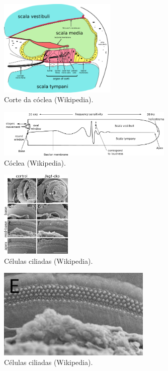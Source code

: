 \begin{frame}[allowframebreaks]
  \begin{figure}[h]
  \centering
  \includegraphics[width=0.5\textwidth]{images/cochlea-crosssection.pdf}
  \caption{Corte da cóclea (Wikipedia).}
  \label{fig-cochlea-crosssection}
  \end{figure}

  \framebreak

  \begin{figure}[h]
  \centering
  \includegraphics[width=0.75\textwidth]{images/uncoiled-cochlea.pdf}
  \caption{Cóclea (Wikipedia).}
  \label{fig-uncoiled-cochlea}
  \end{figure}

  \framebreak

  \begin{figure}[h]
  \centering
  \includegraphics[width=0.3\textwidth]{images/hair-cell-pattern.jpg}
  \caption{Células ciliadas (Wikipedia).}
  \label{fig-hair-cell-pattern}
  \end{figure}

  \framebreak

  \begin{figure}[h]
  \centering
  \includegraphics[width=0.65\textwidth]{images/hair-cell-pattern-E.jpg}
  \caption{Células ciliadas (Wikipedia).}
  \label{fig-hair-cell-pattern-E}
  \end{figure}


\end{frame}
